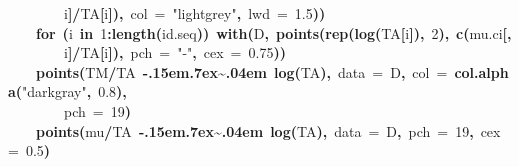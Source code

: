 \documentclass{article}
\makeatletter
\newcommand{\hlnumber}[1]{\textcolor[rgb]{0,0,0}{#1}}%
\newcommand{\hlfunctioncall}[1]{\textcolor[rgb]{.5,0,.33}{\textbf{#1}}}%
\newcommand{\hlstring}[1]{\textcolor[rgb]{.6,.6,1}{#1}}%
\newcommand{\hlkeyword}[1]{\textbf{#1}}%
\newcommand{\hlargument}[1]{\textcolor[rgb]{.69,.25,.02}{#1}}%
\newcommand{\hlsymbol}[1]{#1}%
\def\urltilda{\kern -.15em\lower .7ex\hbox{\~{}}\kern .04em}%
\newcommand{\hlstd}[1]{\textcolor[rgb]{0,0,0}{#1}}%
\newenvironment{kframe}{%
 \def\FrameCommand##1{\hskip\@totalleftmargin \hskip-\fboxsep
 \colorbox{shadecolor}{##1}\hskip-\fboxsep
     \hskip-\linewidth \hskip-\@totalleftmargin \hskip\columnwidth}%
 \MakeFramed {\advance\hsize-\width
   \@totalleftmargin\z@ \linewidth\hsize
   \@setminipage}}%
 {\par\unskip\endMakeFramed}
\newenvironment{knitrout}{}{} %
\makeatother
\begin{document}
\begin{knitrout}
{\begin{kframe}
\begin{flushleft}
\hlstd{}{\ }{\ }{\ }{\ }{\ }{\ }{\ }{\ }\hlsymbol{i}\hlkeyword{]}\hlkeyword{/}\hlsymbol{TA}\hlkeyword{[}\hlsymbol{i}\hlkeyword{]}\hlkeyword{)}\hlkeyword{,}{\ }\hlargument{col}{\ }\hlargument{=}{\ }\hlstring{"lightgrey"}\hlkeyword{,}{\ }\hlargument{lwd}{\ }\hlargument{=}{\ }\hlnumber{1.5}\hlkeyword{)}\hlkeyword{)}\hspace*{\fill}\\
\hlstd{}{\ }{\ }{\ }{\ }\hlkeyword{for}{\ }\hlkeyword{(}\hlsymbol{i}{\ }\hlkeyword{in}{\ }\hlnumber{1}\hlkeyword{:}\hlfunctioncall{length}\hlkeyword{(}\hlsymbol{id.seq}\hlkeyword{)}\hlkeyword{)}{\ }\hlfunctioncall{with}\hlkeyword{(}\hlsymbol{D}\hlkeyword{,}{\ }\hlfunctioncall{points}\hlkeyword{(}\hlfunctioncall{rep}\hlkeyword{(}\hlfunctioncall{log}\hlkeyword{(}\hlsymbol{TA}\hlkeyword{[}\hlsymbol{i}\hlkeyword{]}\hlkeyword{)}\hlkeyword{,}{\ }\hlnumber{2}\hlkeyword{)}\hlkeyword{,}{\ }\hlfunctioncall{c}\hlkeyword{(}\hlsymbol{mu.ci}\hlkeyword{[}\hlkeyword{,}\hspace*{\fill}\\
\hlstd{}{\ }{\ }{\ }{\ }{\ }{\ }{\ }{\ }\hlsymbol{i}\hlkeyword{]}\hlkeyword{/}\hlsymbol{TA}\hlkeyword{[}\hlsymbol{i}\hlkeyword{]}\hlkeyword{)}\hlkeyword{,}{\ }\hlargument{pch}{\ }\hlargument{=}{\ }\hlstring{"-"}\hlkeyword{,}{\ }\hlargument{cex}{\ }\hlargument{=}{\ }\hlnumber{0.75}\hlkeyword{)}\hlkeyword{)}\hspace*{\fill}\\
\hlstd{}{\ }{\ }{\ }{\ }\hlfunctioncall{points}\hlkeyword{(}\hlsymbol{TM}\hlkeyword{/}\hlsymbol{TA}{\ }\hlkeyword{\urltilda{}}{\ }\hlfunctioncall{log}\hlkeyword{(}\hlsymbol{TA}\hlkeyword{)}\hlkeyword{,}{\ }\hlargument{data}{\ }\hlargument{=}{\ }\hlsymbol{D}\hlkeyword{,}{\ }\hlargument{col}{\ }\hlargument{=}{\ }\hlfunctioncall{col.alpha}\hlkeyword{(}\hlstring{"darkgray"}\hlkeyword{,}{\ }\hlnumber{0.8}\hlkeyword{)}\hlkeyword{,}\hspace*{\fill}\\
\hlstd{}{\ }{\ }{\ }{\ }{\ }{\ }{\ }{\ }\hlargument{pch}{\ }\hlargument{=}{\ }\hlnumber{19}\hlkeyword{)}\hspace*{\fill}\\
\hlstd{}{\ }{\ }{\ }{\ }\hlfunctioncall{points}\hlkeyword{(}\hlsymbol{mu}\hlkeyword{/}\hlsymbol{TA}{\ }\hlkeyword{\urltilda{}}{\ }\hlfunctioncall{log}\hlkeyword{(}\hlsymbol{TA}\hlkeyword{)}\hlkeyword{,}{\ }\hlargument{data}{\ }\hlargument{=}{\ }\hlsymbol{D}\hlkeyword{,}{\ }\hlargument{pch}{\ }\hlargument{=}{\ }\hlnumber{19}\hlkeyword{,}{\ }\hlargument{cex}{\ }\hlargument{=}{\ }\hlnumber{0.5}\hlkeyword{)}\hspace*{\fill}\\

\end{flushleft}
\end{kframe}}
\end{knitrout}
\end{document}
